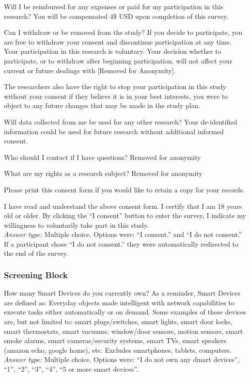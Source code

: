 Will I be reimbursed for any expenses or paid for my participation in this research?
You will be compensated 4\$ USD upon completion of this survey.

Can I withdraw or be removed from the study?
If you decide to participate, you are free to withdraw your consent and discontinue participation at any time. Your participation in this research is voluntary. Your decision whether to participate, or to withdraw after beginning participation, will not affect your current or future dealings with [Removed for Anonymity]. 

The researchers also have the right to stop your participation in this study without your consent if they believe it is in your best interests, you were to object to any future changes that may be made in the study plan.

Will data collected from me be used for any other research?
Your de-identified information could be used for future research without additional informed consent.

Who should I contact if I have questions?
Removed for anonymity

What are my rights as a research subject?
Removed for anonymity

Please print this consent form if you would like to retain a copy for your records.

I have read and understand the above consent form. I certify that I am 18 years old or older. By clicking the “I consent” button to enter the survey, I indicate my willingness to voluntarily take part in this study. \\
\textit{Answer type:} Multiple choice. Options were: ``I consent.'' and ``I do not consent.'' If a participant chose ``I do not consent.'' they were automatically redirected to the end of the survey.

\subsubsection{Screening Block}
\label{appdx:survey:screen}

\printQcounter{} How many Smart Devices do you currently own? As a reminder, Smart Devices are defined as: Everyday objects made intelligent with network capabilities to execute tasks either automatically or on demand. Some examples of these devices are, but not limited to: smart plugs/switches, smart lights, smart door locks, smart thermostats, smart vacuums, window/door sensors, motion sensors, smart smoke alarms, smart cameras/security systems, smart TVs, smart speakers (amazon echo, google home), etc. Excludes smartphones, tablets, computers.\\
\textit{Answer type:} Multiple choice. Options were: ``I do not own any dmart devices'', ``1'', ``2'', ``3'', ``4'', ``5 or more smart devices''.

